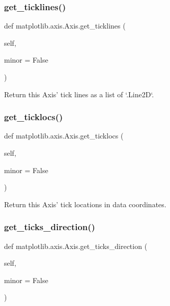 \subsubsection{\texorpdfstring{get\+\_\+ticklines()}{get\_ticklines()}}
{\footnotesize\ttfamily def matplotlib.\+axis.\+Axis.\+get\+\_\+ticklines (\begin{DoxyParamCaption}\item[{}]{self,  }\item[{}]{minor = {\ttfamily False} }\end{DoxyParamCaption})}

\begin{DoxyVerb}Return this Axis' tick lines as a list of `.Line2D`\s.\end{DoxyVerb}
 \mbox{\label{classmatplotlib_1_1axis_1_1Axis_a56ef3024524d0b2d5acf64f1e805cd99}} 
\subsubsection{\texorpdfstring{get\+\_\+ticklocs()}{get\_ticklocs()}}
{\footnotesize\ttfamily def matplotlib.\+axis.\+Axis.\+get\+\_\+ticklocs (\begin{DoxyParamCaption}\item[{}]{self,  }\item[{}]{minor = {\ttfamily False} }\end{DoxyParamCaption})}

\begin{DoxyVerb}Return this Axis' tick locations in data coordinates.\end{DoxyVerb}
 \mbox{\label{classmatplotlib_1_1axis_1_1Axis_a783eacedc68213ee0049028681cee753}} 
\subsubsection{\texorpdfstring{get\+\_\+ticks\+\_\+direction()}{get\_ticks\_direction()}}
{\footnotesize\ttfamily def matplotlib.\+axis.\+Axis.\+get\+\_\+ticks\+\_\+direction (\begin{DoxyParamCaption}\item[{}]{self,  }\item[{}]{minor = {\ttfamily False} }\end{DoxyParamCaption})}

